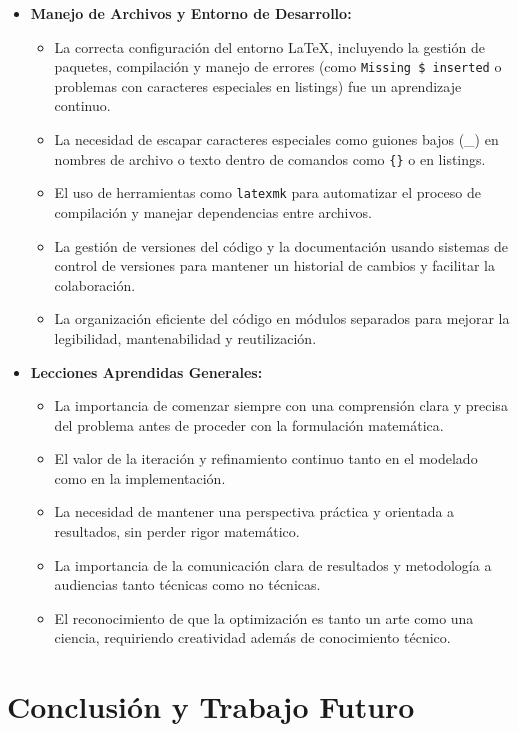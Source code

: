 \documentclass[a4paper,12pt]{article}
\begin{document}
\begin{itemize}
    \item \textbf{Manejo de Archivos y Entorno de Desarrollo:}
    \begin{itemize}
        \item La correcta configuración del entorno LaTeX, incluyendo la gestión de paquetes, compilación y manejo de errores (como \texttt{Missing \$ inserted} o problemas con caracteres especiales en listings) fue un aprendizaje continuo.
        \item La necesidad de escapar caracteres especiales como guiones bajos (\_) en nombres de archivo o texto dentro de comandos como \texttt{\texttt\{\}} o en listings.
        \item El uso de herramientas como \texttt{latexmk} para automatizar el proceso de compilación y manejar dependencias entre archivos.
        \item La gestión de versiones del código y la documentación usando sistemas de control de versiones para mantener un historial de cambios y facilitar la colaboración.
        \item La organización eficiente del código en módulos separados para mejorar la legibilidad, mantenabilidad y reutilización.
    \end{itemize}
    
    \item \textbf{Lecciones Aprendidas Generales:}
    \begin{itemize}
        \item La importancia de comenzar siempre con una comprensión clara y precisa del problema antes de proceder con la formulación matemática.
        \item El valor de la iteración y refinamiento continuo tanto en el modelado como en la implementación.
        \item La necesidad de mantener una perspectiva práctica y orientada a resultados, sin perder rigor matemático.
        \item La importancia de la comunicación clara de resultados y metodología a audiencias tanto técnicas como no técnicas.
        \item El reconocimiento de que la optimización es tanto un arte como una ciencia, requiriendo creatividad además de conocimiento técnico.
    \end{itemize}
\end{itemize}

\section{Conclusión y Trabajo Futuro}
\end{document}
